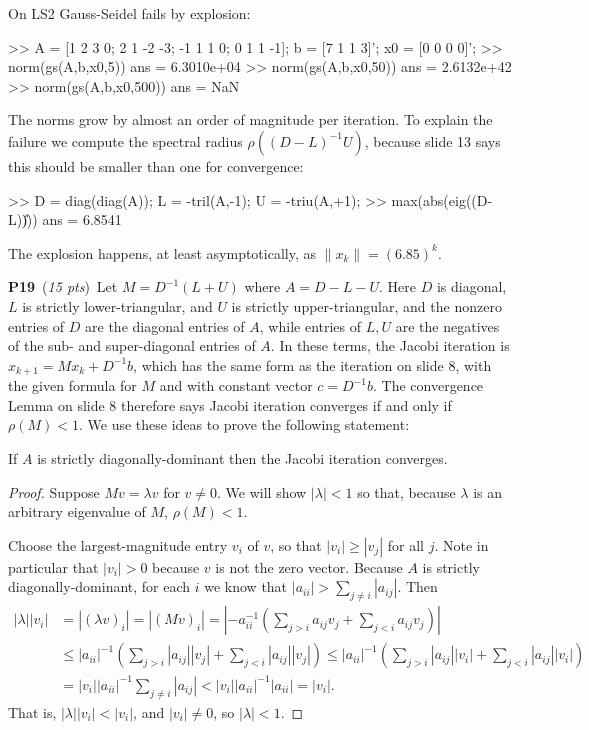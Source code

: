 \documentclass[11pt]{amsart}
\newcommand{\probpts}[2]{\bigskip\noindent\large \textbf{#1} \normalsize \,(\emph{#2})\,}
\begin{document}
On LS2 Gauss-Seidel fails by explosion:
\begin{mVerb}
>> A = [1 2 3 0; 2 1 -2 -3; -1 1 1 0; 0 1 1 -1];  b = [7 1 1 3]';  x0 = [0 0 0 0]';
>> norm(gs(A,b,x0,5))
ans =    6.3010e+04
>> norm(gs(A,b,x0,50))
ans =    2.6132e+42
>> norm(gs(A,b,x0,500))
ans = NaN
\end{mVerb}

The norms grow by almost an order of magnitude per iteration.  To explain the failure we compute the spectral radius $\rho((D-L)^{-1} U)$, because slide 13 says this should be smaller than one for convergence:
\begin{mVerb}
>> D = diag(diag(A));  L = -tril(A,-1);  U = -triu(A,+1);
>> max(abs(eig((D-L)\U)))
ans =  6.8541
\end{mVerb}
The explosion happens, at least asymptotically, as $\|x_k\| = (6.85)^k$.


\probpts{P19}{15 pts}  Let $M = D^{-1}(L+U)$ where $A=D-L-U$.  Here $D$ is diagonal, $L$ is strictly lower-triangular, and $U$ is strictly upper-triangular, and the nonzero entries of $D$ are the diagonal entries of $A$, while entries of $L,U$ are the negatives of the sub- and super-diagonal entries of $A$.  In these terms, the Jacobi iteration is $x_{k+1} = M x_k + D^{-1} b$, which has the same form as the iteration on slide 8, with the given formula for $M$ and with constant vector $c=D^{-1} b$.  The convergence Lemma on slide 8 therefore says Jacobi iteration converges if and only if $\rho(M) < 1$.  We use these ideas to prove the following statement:

\medskip
If $A$ is strictly diagonally-dominant then the Jacobi iteration converges.

\begin{proof} Suppose $M v = \lambda v$ for $v\ne 0$.  We will show $|\lambda|<1$ so that, because $\lambda$ is an arbitrary eigenvalue of $M$, $\rho(M)<1$.

Choose the largest-magnitude entry $v_i$ of $v$, so that $|v_i| \ge |v_j|$ for all $j$.  Note in particular that $|v_i| > 0$ because $v$ is not the zero vector.  Because $A$ is strictly diagonally-dominant, for each $i$ we know that $|a_{ii}| > \sum_{j\ne i} |a_{ij}|$.  Then
\begin{align*}
|\lambda| |v_i| &= |(\lambda v)_i| = |(M v)_i| = \left|- a_{ii}^{-1} \left(\sum_{j>i} a_{ij} v_j + \sum_{j<i} a_{ij} v_j\right)\right| \\
  &\le |a_{ii}|^{-1} \left(\sum_{j>i} |a_{ij}| |v_j| + \sum_{j<i} |a_{ij}| |v_j|\right) \le |a_{ii}|^{-1} \left(\sum_{j>i} |a_{ij}| |v_i| + \sum_{j<i} |a_{ij}| |v_i|\right) \\
  &= |v_i| |a_{ii}|^{-1} \sum_{j\ne i} |a_{ij}| < |v_i| |a_{ii}|^{-1} |a_{ii}| = |v_i|.
\end{align*}
That is, $|\lambda| |v_i| < |v_i|$, and $|v_i|\ne 0$, so $|\lambda|<1$.
\end{proof}
\end{document}
